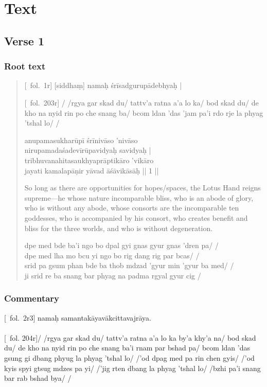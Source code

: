 \documentclass[12pt]{article}
\newcommand{\emdash} {\hspace{0em}—\hspace{0em}}
\begin{document}
\section{Text}
\subsection{Verse 1}
\subsubsection{Root text}
\begin{quote}
	[\MS\ fol.\ 1r] [siddhaṃ]\footnoteB{
		[siddhaṃ]] \MS ; oṁ \EDD
	} namaḥ śrīsadgurupādebhyaḥ |
	
	[\TM\ fol.\ 203r] / /rgya gar skad du/ tattv'a ratna a'a lo ka/ bod skad du/ de kho na nyid rin po che snang ba/ bcom ldan 'das 'jam pa'i rdo rje la phyag 'tshal lo/ /

	anupamasukharūpī śrīnivāso 'nivāso \\
	nirupamadaśadevīrūpavidyaḥ\footnoteB{
		nirupama°] \EDD\ ; nirūpama° \MS
	} savidyaḥ |\\
	tribhuvanahitasaukhyaprāptikāro 'vikāro \\
	jayati kamalapāṇir yāvad āśāvikāsāḥ || 1 ||
	
	So long as there are opportunities for hopes/spaces, the Lotus Hand reigns supreme\emdash he whose nature incomparable bliss, who is an abode of glory, who is without any abode, whose consorts are the incomparable ten goddesses, who is accompanied by his consort, who creates benefit and bliss for the three worlds, and who is without degeneration.
	
	dpe med bde ba'i ngo bo dpal gyi gnas gyur gnas 'dren pa/ /\\
	dpe med lha mo bcu yi ngo bo rig dang rig par bcas/ /\\
	srid pa gsum phan bde ba thob mdzad 'gyur min 'gyur ba med/ /\\
	ji srid re ba snang bar phyag na padma rgyal gyur cig /
\end{quote}

\subsubsection{Commentary}
[\MS\ fol.\ 2r3] namaḥ samantakāyavākcittavajrāya.\\

\textbf{\TVA}\\
{[}\TVA\ fol. 204r{]}/ /rgya gar skad du/ tattv'a ratna a'a lo ka by'a khy'a na/ bod skad du/ de kho na nyid rin po che snang ba'i rnam par bshad pa/ bcom ldan 'das gsung gi dbang phyug la phyag 'tshal lo/ /'od dpag med pa rin chen gyis/ /'od kyis spyi gtsug mdzes pa yi/ /'jig rten dbang la phyag 'tshal lo/ /bzhi pa'i snang bar rab bshad bya/ /\\
\end{document}
